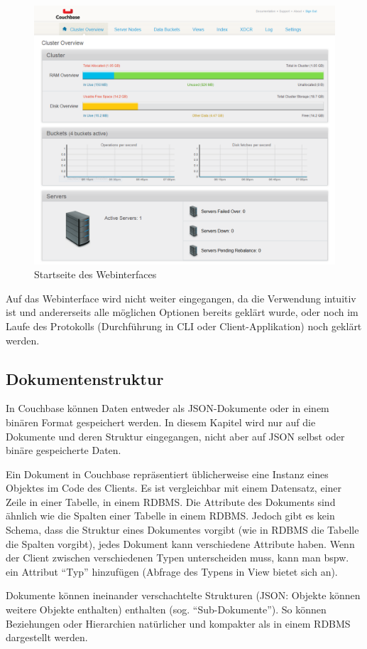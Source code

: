 \begin{figure}[!h]
	\begin{center}
		\includegraphics[width=0.7\linewidth]{images/overview.png}
		\caption{Startseite des Webinterfaces}
	\end{center}
\end{figure}

Auf das Webinterface wird nicht weiter eingegangen, da die Verwendung intuitiv ist und andererseits alle möglichen Optionen bereits geklärt wurde, oder noch im Laufe des Protokolls (Durchführung in CLI oder Client-Applikation) noch geklärt werden.

\subsection{Dokumentenstruktur}
In Couchbase können Daten entweder als JSON-Dokumente oder in einem binären Format gespeichert werden. In diesem Kapitel wird nur auf die Dokumente und deren Struktur eingegangen, nicht aber auf JSON selbst oder binäre gespeicherte Daten.

Ein Dokument in Couchbase repräsentiert üblicherweise eine Instanz eines Objektes im Code des Clients. Es ist vergleichbar mit einem Datensatz, einer Zeile in einer Tabelle, in einem RDBMS. Die Attribute des Dokuments sind ähnlich wie die Spalten einer Tabelle in einem RDBMS. Jedoch gibt es kein Schema, dass die Struktur eines Dokumentes vorgibt (wie in RDBMS die Tabelle die Spalten vorgibt), jedes Dokument kann verschiedene Attribute haben. Wenn der Client zwischen verschiedenen Typen unterscheiden muss, kann man bspw. ein Attribut ``Typ'' hinzufügen (Abfrage des Typens in View bietet sich an).

Dokumente können ineinander verschachtelte Strukturen (JSON: Objekte können weitere Objekte enthalten) enthalten (sog. ``Sub-Dokumente''). So können Beziehungen oder Hierarchien natürlicher und kompakter als in einem RDBMS dargestellt werden.

